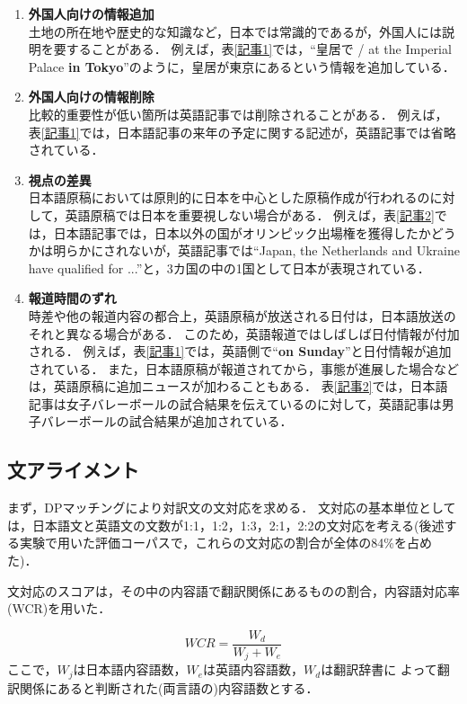 \documentclass{nlp}
\begin{document}
\begin{enumerate}
\item \textbf{外国人向けの情報追加} \\
土地の所在地や歴史的な知識など，日本では常識的であるが，外国人には説明を要することがある．
例えば，表\ref{記事1}では，``皇居で / at the Imperial Palace \textbf{in Tokyo}''のように，皇居が東京にあるという情報を追加している．

\item \textbf{外国人向けの情報削除} \\
比較的重要性が低い箇所は英語記事では削除されることがある．
例えば，表\ref{記事1}では，日本語記事の来年の予定に関する記述が，英語記事では省略されている．

\item \textbf{視点の差異}\\
日本語原稿においては原則的に日本を中心とした原稿作成が行われるのに対して，英語原稿では日本を重要視しない場合がある．
例えば，表\ref{記事2}では，日本語記事では，日本以外の国がオリンピック出場権を獲得したかどうかは明らかにされないが，英語記事では``Japan, the Netherlands and Ukraine have qualified for ...''と，3カ国の中の1国として日本が表現されている．

\item \textbf{報道時間のずれ} \\
時差や他の報道内容の都合上，英語原稿が放送される日付は，日本語放送のそれと異なる場合がある．
このため，英語報道ではしばしば日付情報が付加される．
例えば，表\ref{記事1}では，英語側で``\textbf{on Sunday}''と日付情報が追加されている．
また，日本語原稿が報道されてから，事態が進展した場合などは，英語原稿に追加ニュースが加わることもある．
表\ref{記事2}では，日本語記事は女子バレーボールの試合結果を伝えているのに対して，英語記事は男子バレーボールの試合結果が追加されている．

\end{enumerate}


\subsection{文アライメント}

まず，DPマッチングにより対訳文の文対応を求める．
文対応の基本単位としては，日本語文と英語文の文数が1:1，1:2，1:3，2:1，2:2の文対応を考える(後述する実験で用いた評価コーパスで，これらの文対応の割合が全体の84\%を占めた)．

文対応のスコアは，その中の内容語で翻訳関係にあるものの割合，内容語対応率(WCR)を用いた．


\begin{equation}
WCR = \frac{ W_d }{ W_j + W_e}
\end{equation}
ここで，$W_j$は日本語内容語数，$W_e$は英語内容語数，$W_d$は翻訳辞書に
よって翻訳関係にあると判断された(両言語の)内容語数とする．
\end{document}
